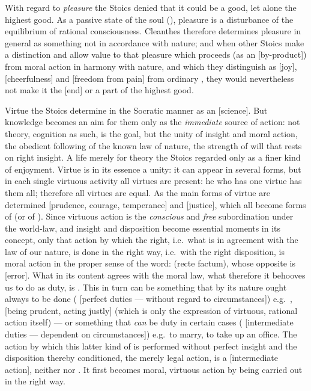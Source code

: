 With regard to \emph{pleasure} the Stoics denied that it could be a good,
let alone the highest good. As a passive state of the soul
(), pleasure is a disturbance of the equilibrium of rational
consciousness. Cleanthes therefore determines pleasure in general as
something not in accordance with nature; and when other Stoics make a
distinction and allow value to that pleasure which proceeds (as an
 [by-product]) from moral action in harmony with nature,
and which they distinguish as  [joy], 
[cheerfulness] and  [freedom from pain] from ordinary
, they would nevertheless not make it the  [end] or a
part of the highest good.

Virtue the Stoics determine in the Socratic manner as an 
[science]. But knowledge becomes an aim for them only as the
\emph{immediate} source of action: not theory, cognition as such, is the
goal, but the unity of insight and moral action, the obedient following
of the known law of nature, the strength of will that rests on right
insight. A life merely for theory the Stoics regarded only as a finer
kind of enjoyment. Virtue is in its essence a unity: it can appear in
several forms, but in each single virtuous activity all virtues are
present: he who has one virtue has them all; therefore all
virtues are equal. As the main forms of virtue are determined
 [prudence, courage, temperance] and
 [justice], which all become forms of  (or of
). Since virtuous action is the \emph{conscious} and
\emph{free} subordination under the world-law, and insight and
disposition become essential moments in its concept, only that action by
which the right, i.e.\ what is in agreement with the law of our nature,
is done in the right way, i.e.\ with the right disposition, is moral
action in the proper sense of the word:  (recte factum),
whose opposite is  [error]. What in its content agrees with
the moral law, what therefore it behooves us to do as duty, is
. This in turn can be something that by its nature ought
always to be done ( [perfect duties --- without regard to
circumstances]) e.g.\ ,  [being
prudent, acting justly] (which is only the expression of virtuous,
rational action itself) --- or something that \emph{can} be duty in
certain cases ( [intermediate duties
--- dependent on circumstances]) e.g.\ to marry, to take up an office.
The action by which this latter kind of  is performed
without perfect insight and the disposition thereby conditioned,
the merely legal action, is a  [intermediate action],
neither  nor . It first becomes moral,
virtuous action by being carried out in the right way.

